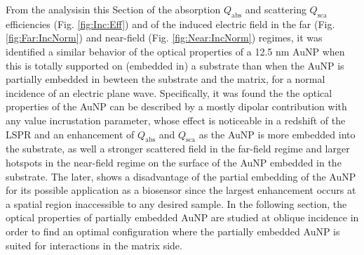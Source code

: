 From the analysisin this Section of the absorption $Q_\text{abs}$ and scattering $Q_\text{sca}$ efficiencies (Fig. \ref{fig:Inc:Eff}) and of the induced electric field in the far (Fig. \ref{fig:Far:IncNorm}) and near-field  (Fig. \ref{fig:Near:IncNorm})  regimes, it was identified a similar behavior of the optical properties of a 12.5 nm AuNP when this is totally supported on (embedded in)  a substrate  than when the AuNP is partially embedded in bewteen the substrate and the matrix, for a normal incidence of an electric plane wave. Specifically, it was found the the optical properties of the AuNP can be described by a mostly dipolar contribution with any value  incrustation parameter, whose effect is noticeable in a redshift of the LSPR and an enhancement of $Q_\text{abs}$  and $Q_\text{sca}$ as the AuNP is more embedded into the substrate, as well a stronger scattered field in the far-field regime and larger hotspots in the near-field regime on the surface of the AuNP embedded in the substrate. The later, shows a disadvantage of the partial embedding of the AuNP for its possible application as a biosensor since the largest enhancement occurs at a spatial region inaccessible to any desired sample. In the following section, the optical properties of partially embedded AuNP are studied at oblique incidence in order to find an optimal configuration where the partially embedded AuNP is suited for interactions in the matrix side.

